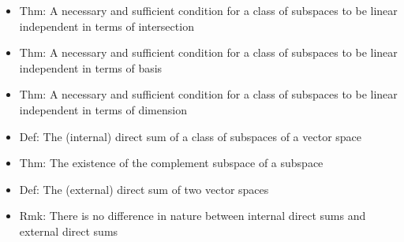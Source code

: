 \documentclass[onecolumn]{ctexart}
\begin{document}
\begin{itemize}
\begin{itemize}
\begin{itemize}
    \end{itemize}
    \item Thm: A necessary and sufficient condition for a class of subspaces to be linear independent in terms of intersection
    \item Thm: A necessary and sufficient condition for a class of subspaces to be linear independent in terms of basis
    \item Thm: A necessary and sufficient condition for a class of subspaces to be linear independent in terms of dimension
    \item Def: The (internal) direct sum of a class of subspaces of a vector space
    \item Thm: The existence of the complement subspace of a subspace
    \item Def: The (external) direct sum of two vector spaces
    \item Rmk: There is no difference in nature between internal direct sums and external direct sums
  \end{itemize}
\end{itemize}
\end{document}
